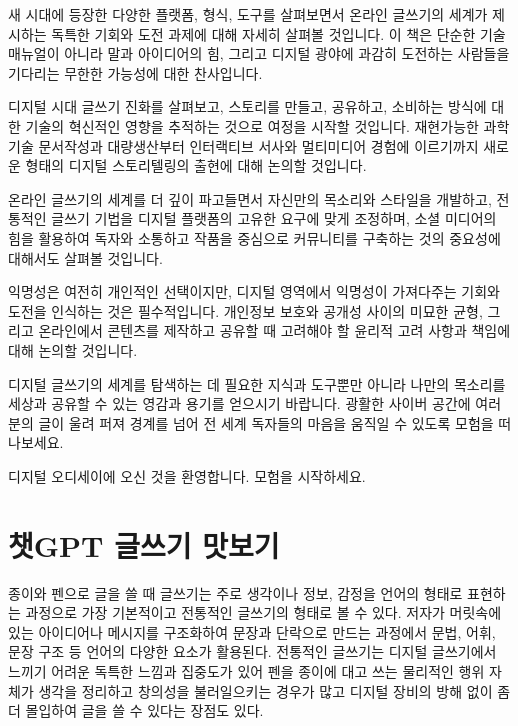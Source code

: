 \documentclass[
  letterpaper,
]{book}
\begin{document}
새 시대에 등장한 다양한 플랫폼, 형식, 도구를 살펴보면서 온라인 글쓰기의
세계가 제시하는 독특한 기회와 도전 과제에 대해 자세히 살펴볼 것입니다.
이 책은 단순한 기술 매뉴얼이 아니라 말과 아이디어의 힘, 그리고 디지털
광야에 과감히 도전하는 사람들을 기다리는 무한한 가능성에 대한
찬사입니다.

디지털 시대 글쓰기 진화를 살펴보고, 스토리를 만들고, 공유하고, 소비하는
방식에 대한 기술의 혁신적인 영향을 추적하는 것으로 여정을 시작할
것입니다. 재현가능한 과학기술 문서작성과 대량생산부터 인터랙티브 서사와
멀티미디어 경험에 이르기까지 새로운 형태의 디지털 스토리텔링의 출현에
대해 논의할 것입니다.

온라인 글쓰기의 세계를 더 깊이 파고들면서 자신만의 목소리와 스타일을
개발하고, 전통적인 글쓰기 기법을 디지털 플랫폼의 고유한 요구에 맞게
조정하며, 소셜 미디어의 힘을 활용하여 독자와 소통하고 작품을 중심으로
커뮤니티를 구축하는 것의 중요성에 대해서도 살펴볼 것입니다.

익명성은 여전히 개인적인 선택이지만, 디지털 영역에서 익명성이 가져다주는
기회와 도전을 인식하는 것은 필수적입니다. 개인정보 보호와 공개성 사이의
미묘한 균형, 그리고 온라인에서 콘텐츠를 제작하고 공유할 때 고려해야 할
윤리적 고려 사항과 책임에 대해 논의할 것입니다.

디지털 글쓰기의 세계를 탐색하는 데 필요한 지식과 도구뿐만 아니라 나만의
목소리를 세상과 공유할 수 있는 영감과 용기를 얻으시기 바랍니다. 광활한
사이버 공간에 여러분의 글이 울려 퍼져 경계를 넘어 전 세계 독자들의
마음을 움직일 수 있도록 모험을 떠나보세요.

디지털 오디세이에 오신 것을 환영합니다. 모험을 시작하세요.


\hypertarget{uxcc57gpt-uxae00uxc4f0uxae30-uxb9dbuxbcf4uxae30}{%
\chapter{챗GPT 글쓰기
맛보기}\label{uxcc57gpt-uxae00uxc4f0uxae30-uxb9dbuxbcf4uxae30}}

종이와 펜으로 글을 쓸 때 글쓰기는 주로 생각이나 정보, 감정을 언어의
형태로 표현하는 과정으로 가장 기본적이고 전통적인 글쓰기의 형태로 볼 수
있다. 저자가 머릿속에 있는 아이디어나 메시지를 구조화하여 문장과
단락으로 만드는 과정에서 문법, 어휘, 문장 구조 등 언어의 다양한 요소가
활용된다. 전통적인 글쓰기는 디지털 글쓰기에서 느끼기 어려운 독특한
느낌과 집중도가 있어 펜을 종이에 대고 쓰는 물리적인 행위 자체가 생각을
정리하고 창의성을 불러일으키는 경우가 많고 디지털 장비의 방해 없이 좀 더
몰입하여 글을 쓸 수 있다는 장점도 있다.
\end{document}
